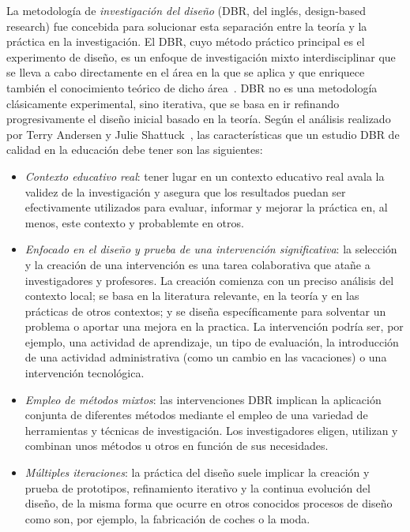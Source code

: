 La metodología de \emph{investigación del diseño} (DBR, del inglés, design-based research) fue concebida para solucionar esta separación entre la teoría y la práctica en la investigación. El DBR, cuyo método práctico principal es el experimento de diseño, es un enfoque de investigación mixto interdisciplinar que se lleva a cabo directamente en el área en la que se aplica y que enriquece también el conocimiento teórico de dicho área~\cite{reimann2011design}. DBR no es una metodología clásicamente experimental, sino iterativa, que se basa en ir refinando progresivamente el diseño inicial basado en la teoría. Según el análisis realizado por Terry Andersen y Julie Shattuck~\cite{anderson2012design}, las características que un estudio DBR de calidad en la educación debe tener son las siguientes:

\begin{itemize}
\item \emph{Contexto educativo real}: tener lugar en un contexto educativo real avala la validez de la investigación y asegura que los resultados puedan ser efectivamente utilizados para evaluar, informar y mejorar la práctica en, al menos, este contexto y probablemte en otros.
\item \emph{Enfocado en el diseño y prueba de una intervención significativa}: la selección y la creación de una intervención es una tarea colaborativa que atañe a investigadores y profesores. La creación comienza con un preciso análisis del contexto local; se basa en la literatura relevante, en la teoría y en las prácticas de otros contextos; y se diseña específicamente para solventar un problema o aportar una mejora en la practica. La intervención podría ser, por ejemplo, una actividad de aprendizaje, un tipo de evaluación, la introducción de una actividad administrativa (como un cambio en las vacaciones) o una intervención tecnológica. %
\item \emph{Empleo de métodos mixtos}: las intervenciones DBR implican la aplicación conjunta de diferentes métodos mediante el empleo de una variedad de herramientas y técnicas de investigación. Los investigadores eligen, utilizan y combinan unos métodos u otros en función de sus necesidades.
\item \emph{Múltiples iteraciones}: la práctica del diseño suele implicar la creación y prueba de prototipos, refinamiento iterativo y la continua evolución del diseño, de la misma forma que ocurre en otros conocidos procesos de diseño como son, por ejemplo, la fabricación de coches o la moda.

\end{itemize}
